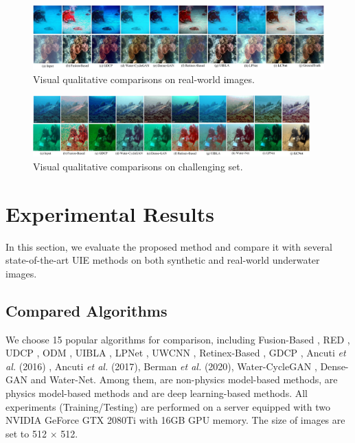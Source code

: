 \documentclass[journal]{IEEEtran}
\begin{document}
\begin{figure}[h] 
\centering 
{   
\includegraphics[width=1\textwidth]{Figs/Fig6.jpg}

}          
\caption{Visual qualitative comparisons on real-world images.}
\label{Fig6} 
\end{figure} 

\begin{figure}[h] 
\centering 
{   
\includegraphics[width=0.95\textwidth]{Figs/Fig7.jpg}

}          
\caption{Visual qualitative comparisons on challenging set.}
\label{Fig7} 
\end{figure} 


\section{Experimental Results}
In this section, we evaluate the proposed method and compare it with several state-of-the-art UIE methods on both synthetic and real-world underwater images. 

\subsection{Compared Algorithms}
We choose 15 popular algorithms for comparison, including Fusion-Based \cite{fusion-based}, RED \cite{RED}, UDCP \cite{UDCP}, ODM \cite{Histogram-prior}, UIBLA \cite{blurriness-based}, LPNet \cite{fu2019lightweight}, UWCNN \cite{uwcnn}, Retinex-Based \cite{fu2014retinex}, GDCP \cite{GDCP}, Ancuti \textit{et al.} (2016) \cite{ancuti2016multi}, Ancuti \textit{et al.} (2017)\cite{ancuti2017color}, Berman \textit{et al.} (2020)\cite{berman2020underwater}, Water-CycleGAN \cite{water-gan}, Dense-GAN \cite{dense-gan} and Water-Net\cite{water-net}. Among them, \cite{ancuti2016multi,ancuti2017color,fusion-based} are non-physics model-based methods, \cite{UDCP,GDCP,blurriness-based,ancuti2016multi,Histogram-prior,berman2020underwater,fu2014retinex} are physics model-based methods and \cite{fu2019lightweight,uwcnn,water-gan,dense-gan,water-net} are deep learning-based methods. All experiments (Training/Testing) are performed on a server equipped with two NVIDIA GeForce GTX 2080Ti with 16GB GPU memory. The size of images are set to 512 \(\times\) 512.
\end{document}
